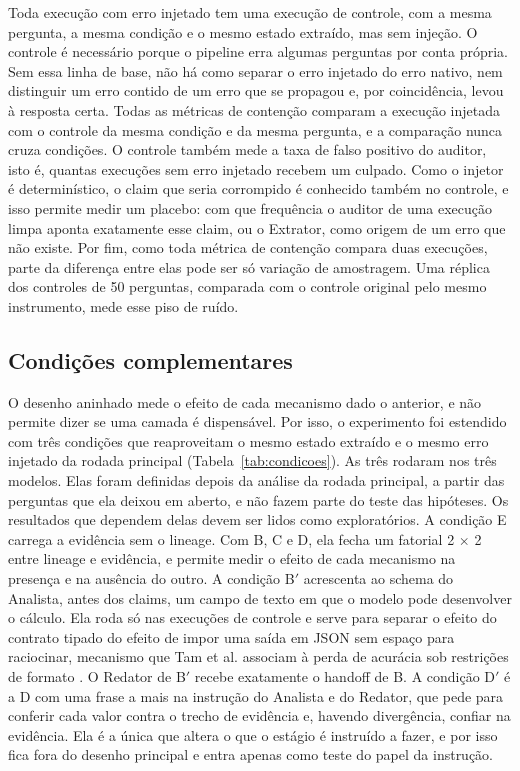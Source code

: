 Toda execução com erro injetado tem uma execução de controle, com a mesma pergunta, a mesma condição e o mesmo estado extraído, mas sem injeção.
O controle é necessário porque o pipeline erra algumas perguntas por conta própria.
Sem essa linha de base, não há como separar o erro injetado do erro nativo, nem distinguir um erro contido de um erro que se propagou e, por coincidência, levou à resposta certa.
Todas as métricas de contenção comparam a execução injetada com o controle da mesma condição e da mesma pergunta, e a comparação nunca cruza condições.
O controle também mede a taxa de falso positivo do auditor, isto é, quantas execuções sem erro injetado recebem um culpado.
Como o injetor é determinístico, o claim que seria corrompido é conhecido também no controle, e isso permite medir um placebo: com que frequência o auditor de uma execução limpa aponta exatamente esse claim, ou o Extrator, como origem de um erro que não existe.
Por fim, como toda métrica de contenção compara duas execuções, parte da diferença entre elas pode ser só variação de amostragem. Uma réplica dos controles de 50 perguntas, comparada com o controle original pelo mesmo instrumento, mede esse piso de ruído.

\subsection{Condições complementares}\label{sec:complementares}

O desenho aninhado mede o efeito de cada mecanismo dado o anterior, e não permite dizer se uma camada é dispensável.
Por isso, o experimento foi estendido com três condições que reaproveitam o mesmo estado extraído e o mesmo erro injetado da rodada principal (Tabela~\ref{tab:condicoes}). As três rodaram nos três modelos.
Elas foram definidas depois da análise da rodada principal, a partir das perguntas que ela deixou em aberto, e não fazem parte do teste das hipóteses. Os resultados que dependem delas devem ser lidos como exploratórios.
A condição E carrega a evidência sem o lineage. Com B, C e D, ela fecha um fatorial 2 $\times$ 2 entre lineage e evidência, e permite medir o efeito de cada mecanismo na presença e na ausência do outro.
A condição B$'$ acrescenta ao schema do Analista, antes dos claims, um campo de texto em que o modelo pode desenvolver o cálculo. Ela roda só nas execuções de controle e serve para separar o efeito do contrato tipado do efeito de impor uma saída em JSON sem espaço para raciocinar, mecanismo que Tam et al. associam à perda de acurácia sob restrições de formato \cite{tam2024speak}. O Redator de B$'$ recebe exatamente o handoff de B.
A condição D$'$ é a D com uma frase a mais na instrução do Analista e do Redator, que pede para conferir cada valor contra o trecho de evidência e, havendo divergência, confiar na evidência.
Ela é a única que altera o que o estágio é instruído a fazer, e por isso fica fora do desenho principal e entra apenas como teste do papel da instrução.

